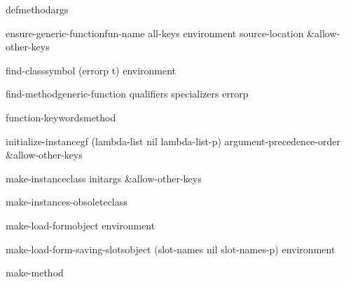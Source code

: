 \begin{macro}{defmethod}{\rest args}{}
  
\end{macro}

\begin{function}{ensure-generic-function}{fun-name \rest all-keys \key environment source-location &allow-other-keys}{}
  
\end{function}

\begin{accessor}{find-class}{symbol \op (errorp t) environment}{}
  
\end{accessor}

\begin{generic}{find-method}{generic-function qualifiers specializers \op errorp}{}
  
\end{generic}

\begin{generic}{function-keywords}{method}{}
  
\end{generic}

\begin{generic}{initialize-instance}{gf \key (lambda-list nil lambda-list-p) argument-precedence-order
 &allow-other-keys}{}
  
\end{generic}

\begin{generic}{make-instance}{class \rest initargs &allow-other-keys}{}
  
\end{generic}

\begin{generic}{make-instances-obsolete}{class}{}
  
\end{generic}

\begin{generic}{make-load-form}{object \op environment}{}
  
\end{generic}

\begin{function}{make-load-form-saving-slots}{object \key (slot-names nil slot-names-p) environment}{}
  
\end{function}

\begin{local-macro}{make-method}{}{}
  
\end{local-macro}

